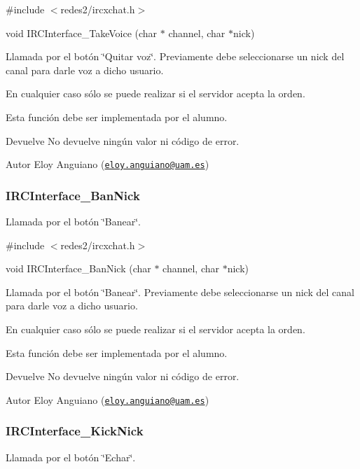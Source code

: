 \#include $<$redes2/ircxchat.\-h$>$

void I\-R\-C\-Interface\-\_\-\-Take\-Voice (char $\ast$ channel, char $\ast$nick)

Llamada por el botón \char`\"{}\-Quitar voz\char`\"{}. Previamente debe seleccionarse un nick del canal para darle voz a dicho usuario.

En cualquier caso sólo se puede realizar si el servidor acepta la orden.

Esta función debe ser implementada por el alumno.

\begin{DoxyReturn}{Devuelve}
No devuelve ningún valor ni código de error.
\end{DoxyReturn}
\begin{DoxyAuthor}{Autor}
Eloy Anguiano (\href{mailto:eloy.anguiano@uam.es}{\tt eloy.\-anguiano@uam.\-es})
\end{DoxyAuthor}


 \hypertarget{IRCInterface_BanNick}{}\subsubsection{I\-R\-C\-Interface\-\_\-\-Ban\-Nick}\label{IRCInterface_BanNick}
Llamada por el botón \char`\"{}\-Banear\char`\"{}.

\#include $<$redes2/ircxchat.\-h$>$

void I\-R\-C\-Interface\-\_\-\-Ban\-Nick (char $\ast$ channel, char $\ast$nick)

Llamada por el botón \char`\"{}\-Banear\char`\"{}. Previamente debe seleccionarse un nick del canal para darle voz a dicho usuario.

En cualquier caso sólo se puede realizar si el servidor acepta la orden.

Esta función debe ser implementada por el alumno.

\begin{DoxyReturn}{Devuelve}
No devuelve ningún valor ni código de error.
\end{DoxyReturn}
\begin{DoxyAuthor}{Autor}
Eloy Anguiano (\href{mailto:eloy.anguiano@uam.es}{\tt eloy.\-anguiano@uam.\-es})
\end{DoxyAuthor}


 \hypertarget{IRCInterface_KickNick}{}\subsubsection{I\-R\-C\-Interface\-\_\-\-Kick\-Nick}\label{IRCInterface_KickNick}
Llamada por el botón \char`\"{}\-Echar\char`\"{}.

